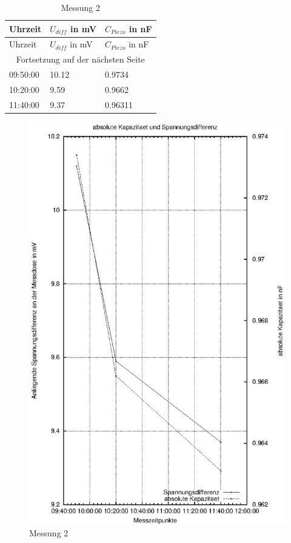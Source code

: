 \documentclass[11pt]{scrreprt} %
\begin{document}
\setlongtables
\begin{longtable}{| l | l | l |}
\caption{Messung 2 }\\
\hline
Uhrzeit&$U_{diff}$ in mV&$C_{Piezo}$ in nF\\
\hline
\endfirsthead
\hline
Uhrzeit&$U_{diff}$ in mV&$C_{Piezo}$ in nF\\
\hline
\endhead
\hline
\multicolumn{3}{|c|}{Fortsetzung auf der nächsten Seite}\\
\hline
\endfoot
\hline \hline
\endlastfoot
\hline
\label{tab:2.2}%
09:50:00&10.12&0.9734\\
10:20:00&9.59&0.9662\\
11:40:00&9.37&0.96311\\
\end{longtable}

\begin {figure}[htbp]
      \begin{center}
        \includegraphics{tabelle2_1_2}
      \end{center}
\caption{Messung 2}
\label{fig:2.2}
\end{figure}
\newpage
\end{document}
